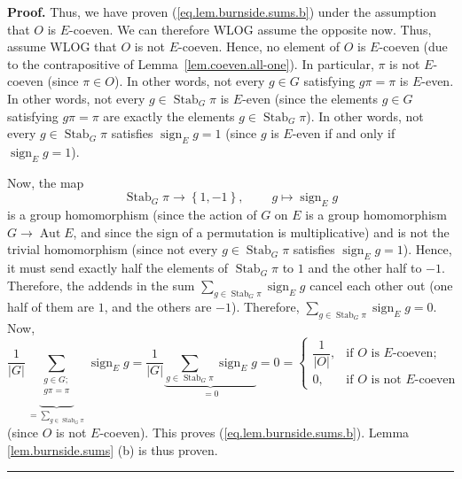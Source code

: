 \documentclass[numbers=enddot,12pt,final,onecolumn,notitlepage,abstracton]{scrartcl}
\theoremstyle{definition}
\newenvironment{proof}[1][Proof]{\noindent\textbf{#1.} }{\ \rule{0.5em}{0.5em}}
\let\sumnonlimits\sum
\renewcommand{\sum}{\sumnonlimits\limits}
\newcommand{\sign}{\operatorname{sign}}
\newcommand{\Stab}{\operatorname{Stab}}
\begin{document}
\begin{proof}
Thus, we have proven (\ref{eq.lem.burnside.sums.b}) under the assumption that
$O$ is $E$-coeven. We can therefore WLOG assume the opposite now. Thus, assume
WLOG that $O$ is not $E$-coeven. Hence, no element of $O$ is
$E$-coeven (due to the contrapositive of Lemma~\ref{lem.coeven.all-one}).
In particular, $\pi$ is not $E$-coeven (since $\pi \in O$).
In other words, not every $g\in G$ satisfying $g\pi=\pi$ is
$E$-even. In other words, not every $g\in \Stab_G \pi$
is $E$-even (since the elements $g\in G$ satisfying $g\pi=\pi$ are exactly the
elements $g\in \Stab_G \pi$). In other words, not
every $g\in \Stab_G \pi$ satisfies
$\sign_E g = 1$ (since $g$ is $E$-even if and only if
$\sign_E g = 1$).

Now, the map
\[
 \Stab_G \pi\rightarrow\left\{  1,-1\right\}
,\ \ \ \ \ \ \ \ \ \ g \mapsto \sign_E g
\]
is a group homomorphism (since the action of $G$ on $E$ is a group
homomorphism $G \to \operatorname{Aut} E$, and since
the sign of a permutation is multiplicative)
and is not the trivial homomorphism (since not every
$g \in \Stab_G \pi$ satisfies $\sign_E g = 1$). Hence, it
must send exactly half the elements of $ \Stab_G \pi$
to $1$ and the other half to $-1$. Therefore, the addends in the sum
$\sum_{g\in \Stab_G \pi}
\sign_E g$ cancel each other out (one half of them are $1$, and the
others are $-1$). Therefore,
$\sum_{g\in \Stab_G \pi} \sign_E g = 0$. Now,
\[
\dfrac{1}{\left\vert G\right\vert }\underbrace{\sum_{\substack{g\in
G;\\g\pi=\pi}}}_{=\sum_{g\in \Stab_G \pi}}
\sign_E g
= \dfrac{1}{\left\vert G\right\vert }
\underbrace{\sum_{g\in \Stab_G \pi} \sign_E g}_{=0}
= 0
=
\begin{cases}
\dfrac{1}{\left\vert O\right\vert }, & \text{if }O\text{ is }E\text{-coeven}%
;\\
0, & \text{if }O\text{ is not }E\text{-coeven}%
\end{cases}
\]
(since $O$ is not $E$-coeven).
This proves (\ref{eq.lem.burnside.sums.b}). Lemma \ref{lem.burnside.sums} (b)
is thus proven.
\end{proof}
\end{document}
